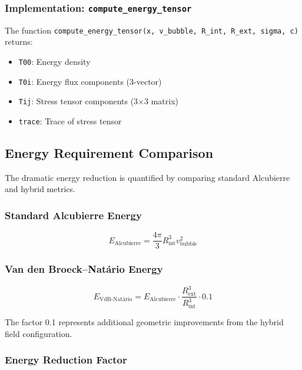 \subsubsection{Implementation: \texttt{compute\_energy\_tensor}}

The function \texttt{compute\_energy\_tensor(x, v\_bubble, R\_int, R\_ext, sigma, c)} returns:

\begin{itemize}
\item \texttt{T00}: Energy density
\item \texttt{T0i}: Energy flux components (3-vector)
\item \texttt{Tij}: Stress tensor components (3×3 matrix)
\item \texttt{trace}: Trace of stress tensor
\end{itemize}

\subsection{Energy Requirement Comparison}

The dramatic energy reduction is quantified by comparing standard Alcubierre and hybrid metrics.

\subsubsection{Standard Alcubierre Energy}

\begin{equation}
E_{\text{Alcubierre}} = \frac{4\pi}{3} R_{\text{int}}^3 v_{\text{bubble}}^2
\end{equation}

\subsubsection{Van den Broeck–Natário Energy}

\begin{equation}
E_{\text{VdB-Natário}} = E_{\text{Alcubierre}} \cdot \frac{R_{\text{ext}}^3}{R_{\text{int}}^3} \cdot 0.1
\end{equation}

The factor 0.1 represents additional geometric improvements from the hybrid field configuration.

\subsubsection{Energy Reduction Factor}

